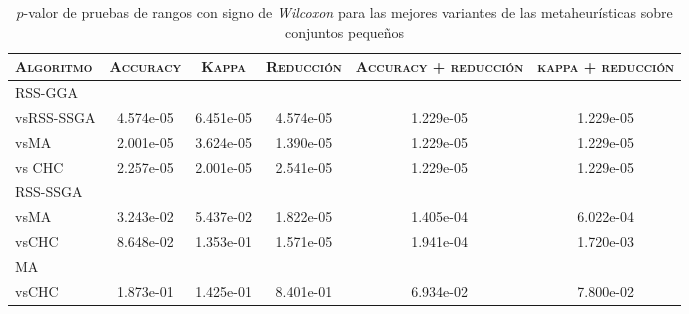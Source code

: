 \begin{table}[h!]
\centering
\begin{adjustbox}{max width =\textwidth}
\begin{tabular}{l c c c c c}
\hline
	\textsc{Algoritmo}
	& \multicolumn{1}{c}{\textsc{Accuracy}}
	& \multicolumn{1}{c}{\textsc{Kappa}}
	& \multicolumn{1}{c}{\textsc{Reducción}} 
	& \multicolumn{1}{c}{\textsc{Accuracy + reducción}} 
	& \multicolumn{1}{c}{\textsc{kappa + reducción}} \\
\hline
\hline

RSS-GGA\\
vsRSS-SSGA & 4.574e-05 & 6.451e-05 & 4.574e-05 & 1.229e-05 & 1.229e-05 \\
vsMA       & 2.001e-05 & 3.624e-05 & 1.390e-05 & 1.229e-05 & 1.229e-05 \\
vs CHC     & 2.257e-05 & 2.001e-05 & 2.541e-05 & 1.229e-05 & 1.229e-05 \\

\hline 

RSS-SSGA\\
vsMA  & 3.243e-02 & 5.437e-02 & 1.822e-05 & 1.405e-04 & 6.022e-04 \\
vsCHC & 8.648e-02 & 1.353e-01 & 1.571e-05 & 1.941e-04 & 1.720e-03 \\

\hline

MA\\
vsCHC & 1.873e-01 & 1.425e-01 & 8.401e-01 & 6.934e-02 & 7.800e-02 \\

\hline

\end{tabular}
\end{adjustbox}
\caption[Pruebas de \emph{Wilcoxon} entre las mejores variaciones de cada metaheurística para conjuntos pequeños]{$p$-valor de pruebas de rangos con signo de \emph{Wilcoxon} para las mejores variantes de las metaheurísticas sobre conjuntos pequeños}
\label{wilcox-best-peq}
\end{table}

